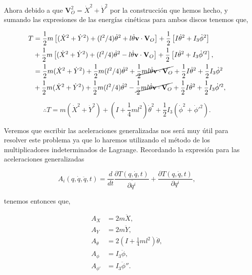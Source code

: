 \documentclass[a4paper,10pt]{article}
\numberwithin{equation}{section}
\begin{document}
Ahora debido a que $\mathbf{V}_O^2 = \dot{X}^2 + \dot{Y}^2$ por la 
construcción que hemos hecho, y sumando las expresiones de las energías 
cinéticas para ambos discos tenemos que,

\begin{align*}
 T &= \frac{1}{2}m\left[(\dot{X}^2 + \dot{Y}^2) + (l^2/4)\dot{\theta}^2 +
 l\dot{\theta}\mathbf{v}\cdot\mathbf{V}_O \right]
 + \frac{1}{2}\left[ I\dot{\theta}^2 + I_3\dot{\phi}^2\right] \\
 &+ \frac{1}{2}m\left[(\dot{X}^2 + \dot{Y}^2) + (l^2/4)\dot{\theta}^2 
 - l\dot{\theta}\mathbf{v}\cdot\mathbf{V}_O \right]
 + \frac{1}{2}\left[ I\dot{\theta}^2 + I_3\dot{\phi}'^2\right], \\
   &= \frac{1}{2}m(\dot{X}^2 + \dot{Y}^2) + \frac{1}{2}m(l^2/4)\dot{\theta}^2 +
      \cancel{\frac{1}{2}ml\dot{\theta}\mathbf{v}\cdot\mathbf{V}_O}
      + \frac{1}{2}I\dot{\theta}^2 + \frac{1}{2}I_3\dot{\phi}^2 \\
  &+ \frac{1}{2}m(\dot{X}^2 + \dot{Y}^2) + \frac{1}{2}m(l^2/4)\dot{\theta}^2 -
      \cancel{\frac{1}{2}ml\dot{\theta}\mathbf{v}\cdot\mathbf{V}_O}
      + \frac{1}{2}I\dot{\theta}^2 + \frac{1}{2}I_3\dot{\phi}'^2,
\end{align*}

\begin{equation}
 \therefore T = m\left(\dot{X}^2 + \dot{Y}^2\right)  
 +\left( I + \frac{1}{4}ml^2 \right) \dot{\theta}^2 
 + \frac{1}{2}I_3 \left(\dot{\phi}^2 + \dot{\phi}'^2\right).
\end{equation}

Veremos que escribir las aceleraciones generalizadas nos será muy útil
para resolver este problema ya que lo haremos utilizando el método de 
los multiplicadores indeterminados de Lagrange. Recordando la expresión
para las aceleraciones generalizadas 

\begin{equation}
 A_i(q,\dot{q},\ddot{q},t) = \frac{d}{dt}\frac{\partial T(q,\dot{q},t)}{\partial\dot{q^i}}
 + \frac{\partial T(q,\dot{q},t)}{\partial q^i},
\end{equation}

tenemos entonces que,

\begin{align}
 A_X &= 2m\ddot{X}, \\
 A_Y &= 2m\ddot{Y}, \\
 A_\theta &= 2 \left( I + \frac{1}{4}ml^2 \right) \ddot{\theta}, \\
 A_\phi &= I_3\ddot{\phi}, \\
 A_{\phi'} &= I_3\ddot{\phi}''.
\end{align}
\end{document}
